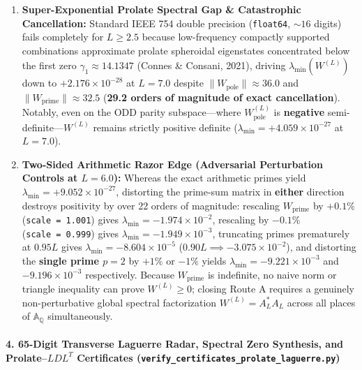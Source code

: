 \documentclass[
  11pt,
]{article}
\providecommand{\tightlist}{%
  \setlength{\itemsep}{0pt}\setlength{\parskip}{0pt}}
\begin{document}
\begin{enumerate}
\def\labelenumi{\arabic{enumi}.}
\tightlist
\item
  \textbf{Super-Exponential Prolate Spectral Gap \& Catastrophic
  Cancellation:} Standard IEEE 754 double precision (\texttt{float64},
  \(\sim 16\) digits) fails completely for \(L \ge 2.5\) because
  low-frequency compactly supported combinations approximate prolate
  spheroidal eigenstates concentrated below the first zero
  \(\gamma_1 \approx 14.1347\) (Connes \& Consani, 2021), driving
  \(\lambda_{\min}(W^{(L)})\) down to \(+2.176 \times 10^{-28}\) at
  \(L = 7.0\) despite \(\|W_{\text{pole}}\| \approx 36.0\) and
  \(\|W_{\text{prime}}\| \approx 32.5\) (\textbf{29.2 orders of
  magnitude of exact cancellation}). Notably, even on the ODD parity
  subspace---where \(W_{\text{pole}}^{(L)}\) is \textbf{negative}
  semi-definite---\(W^{(L)}\) remains strictly positive definite
  (\(\lambda_{\min} = +4.059 \times 10^{-27}\) at \(L = 7.0\)).
\item
  \textbf{Two-Sided Arithmetic Razor Edge (Adversarial Perturbation
  Controls at \(L = 6.0\)):} Whereas the exact arithmetic primes yield
  \(\lambda_{\min} = +9.052 \times 10^{-27}\), distorting the prime-sum
  matrix in \textbf{either} direction destroys positivity by over 22
  orders of magnitude: rescaling \(W_{\text{prime}}\) by \(+0.1\%\)
  (\texttt{scale\ =\ 1.001}) gives
  \(\lambda_{\min} = -1.974 \times 10^{-2}\), rescaling by \(-0.1\%\)
  (\texttt{scale\ =\ 0.999}) gives
  \(\lambda_{\min} = -1.949 \times 10^{-3}\), truncating primes
  prematurely at \(0.95 L\) gives
  \(\lambda_{\min} = -8.604 \times 10^{-5}\)
  (\(0.90 L \implies -3.075 \times 10^{-2}\)), and distorting the
  \textbf{single prime \(p = 2\)} by \(+1\%\) or \(-1\%\) yields
  \(\lambda_{\min} = -9.221 \times 10^{-3}\) and
  \(-9.196 \times 10^{-3}\) respectively. Because \(W_{\text{prime}}\)
  is indefinite, no naive norm or triangle inequality can prove
  \(W^{(L)} \ge 0\); closing Route A requires a genuinely
  non-perturbative global spectral factorization \(W^{(L)} = A_L^* A_L\)
  across all places of \(\mathbb{A}_\mathbb{Q}\) simultaneously.
\end{enumerate}

\paragraph{\texorpdfstring{4. 65-Digit Transverse Laguerre Radar,
Spectral Zero Synthesis, and Prolate--\(LDL^T\) Certificates
(\texttt{verify\_certificates\_prolate\_laguerre.py})}{4. 65-Digit Transverse Laguerre Radar, Spectral Zero Synthesis, and Prolate--LDL\^{}T Certificates (verify\_certificates\_prolate\_laguerre.py)}}\label{digit-transverse-laguerre-radar-spectral-zero-synthesis-and-prolateldlt-certificates-verify_certificates_prolate_laguerre.py}
\end{document}
